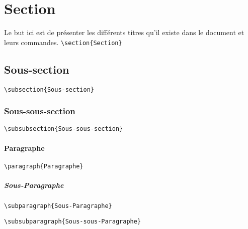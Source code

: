 \section{Section}
Le but ici est de présenter les différents titres qu'il existe dans le document
et leurs commandes. \newline
\verb=\section{Section}= \newline

\lipsum[1]

\subsection{Sous-section}

\verb=\subsection{Sous-section}= \newline

\lipsum[2]

\subsubsection{Sous-sous-section}

\verb=\subsubsection{Sous-sous-section}= \newline

\lipsum[3]

\paragraph{Paragraphe}

\verb=\paragraph{Paragraphe}= \newline

\lipsum[4]

\subparagraph{Sous-Paragraphe}

\verb=\subparagraph{Sous-Paragraphe}= \newline

\lipsum[5]


\verb=\subsubparagraph{Sous-sous-Paragraphe}= \newline

\lipsum[6]